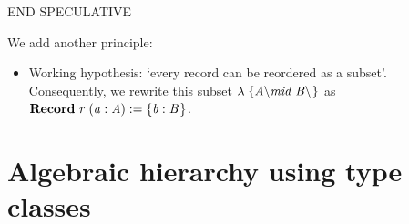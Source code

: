 \documentclass[a4paper,10pt, runningheads]{llncs}
\newcommand{\Conid}[1]{\mathit{#1}}
\newcommand{\Varid}[1]{\mathit{#1}}
\begin{document}
END SPECULATIVE

We add another principle:
\begin{itemize}\setcounter{enumi}{3}
 \item Working hypothesis: `every record can be reordered as a subset'. Consequently, we
rewrite this subset \ensuremath{\lambda \;\hspace*{0mm}\{\Conid{A\char92 mid}\;\Conid{B\char92 }\mskip1.5mu\}} as \ensuremath{\mathbf{Record}\;\Varid{r}\;(\Varid{a:A})\;\Conid{:=}\;\hspace*{0mm}\{\Varid{b:B}\mskip1.5mu\}}.
\end{itemize}

\section{Algebraic hierarchy using type classes}\label{classes}
\end{document}
